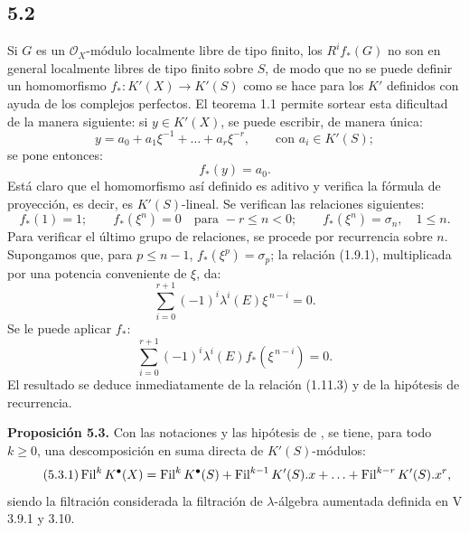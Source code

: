\subsection*{5.2}
Si $G$ es un $\mathcal O_X$-módulo localmente libre de tipo finito, los $R^if_*(G)$ no son en general localmente libres de tipo finito sobre $S$, de modo que no se puede definir un homomorfismo $f_*:K'(X)\to K'(S)$ como se hace para los $K'$ definidos con ayuda de los complejos perfectos. El teorema 1.1 permite sortear esta dificultad de la manera siguiente: si $y\in K'(X)$, se puede escribir, de manera única:
\begin{equation}\tag{5.2.1}
  y=a_0+a_1\xi^{-1}+\ldots+a_r\xi^{-r},\qquad \text{con } a_i\in K'(S);
\end{equation}
se pone entonces:
\begin{equation}\tag{5.2.2}
  f_*(y)=a_0 .
\end{equation}
Está claro que el homomorfismo así definido es aditivo y verifica la fórmula de proyección, es decir, es $K'(S)$-lineal. Se verifican las relaciones siguientes:
\begin{equation}\tag{5.2.3}
  f_*(1)=1;\qquad
  f_*(\xi^n)=0\quad\text{para }-r\le n<0;\qquad
  f_*(\xi^n)=\sigma_n,
  \quad 1\le n .
\end{equation}
Para verificar el último grupo de relaciones, se procede por recurrencia sobre $n$. Supongamos que, para $p\le n-1$, $f_*(\xi^p)=\sigma_p$; la relación (1.9.1), multiplicada por una potencia conveniente de $\xi$, da:
\[
  \sum_{i=0}^{r+1}(-1)^i\lambda^i(E)\xi^{\,n-i}=0 .
\]
Se le puede aplicar $f_*$:
\[
  \sum_{i=0}^{r+1}(-1)^i\lambda^i(E)f_*(\xi^{\,n-i})=0 .
\]
El resultado se deduce inmediatamente de la relación (1.11.3) y de la hipótesis de recurrencia.

\textbf{Proposición 5.3.} Con las notaciones y las hipótesis de , se tiene, para todo $k\ge 0$, una descomposición en suma directa de $K'(S)$-módulos:
\begin{equation}\tag{5.3.1}
  \operatorname{Fil}^kK^{\bullet}(X)=\operatorname{Fil}^kK^{\bullet}(S)+\operatorname{Fil}^{k-1}K'(S).x+\ldots+\operatorname{Fil}^{k-r}K'(S).x^r,
\end{equation}
siendo la filtración considerada la filtración de $\lambda$-álgebra aumentada definida en V 3.9.1 y 3.10.

